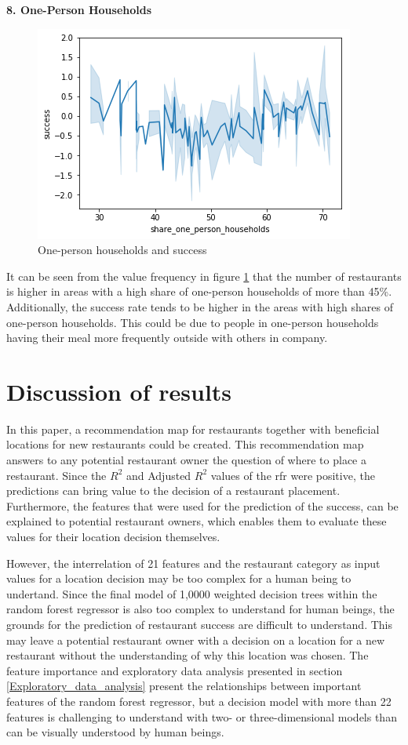 \documentclass[a4paper, 11pt, oneside]{Thesis}  %
\begin{document}
\textbf{8.	One-Person Households}
 
\begin{figure}[h]
\includegraphics[scale=0.7]{Figures/Exploratory/lineplot_one_person_households.png}
\centering
\caption{One-person households and success}
\label{fig:lineplot_one_person_households}
\end{figure}

It can be seen from the value frequency in figure \ref{fig:lineplot_one_person_households} that the number of restaurants is higher in areas with a high share of one-person households of more than 45\%. Additionally, the success rate tends to be higher in the areas with high shares of one-person households. This could be due to people in one-person households having their meal more frequently outside with others in company.

\section{Discussion of results}
\label{discussion_of_results}

In this paper, a recommendation map for restaurants together with beneficial locations for new restaurants could be created. This recommendation map answers to any potential restaurant owner the question of where to place a restaurant. Since the $R^2$ and Adjusted $R^2$ values of the \ac{rfr} were positive, the predictions can bring value to the decision of a restaurant placement. Furthermore, the features that were used for the prediction of the success, can be explained to potential restaurant owners, which enables them to evaluate these values for their location decision themselves.

However, the interrelation of 21 features and the restaurant category as input values for a location decision may be too complex for a human being to undertand. Since the final model of 1,0000 weighted decision trees within the random forest regressor is also too complex to understand for human beings, the grounds for the prediction of restaurant success are difficult to understand. This may leave a potential restaurant owner with a decision on a location for a new restaurant without the understanding of why this location was chosen. The feature importance and exploratory data analysis presented in section \ref{Exploratory_data_analysis} present the relationships between important features of the random forest regressor, but a decision model with more than 22 features is challenging to understand with two- or three-dimensional models than can be visually understood by human beings.
\end{document}
